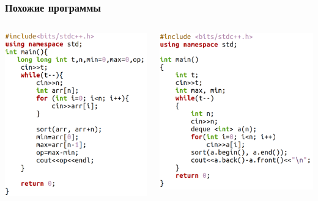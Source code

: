 \documentclass[10pt]{beamer}
\begin{document}
\begin{frame}[fragile]\frametitle{Похожие программы}
	\begin{columns}
		\centering
		\includegraphics[scale=0.57]{example.png}
		
		\centering
		\includegraphics[scale=0.57]{example2.png}
		
	\end{columns}
\end{frame}
\end{document}
